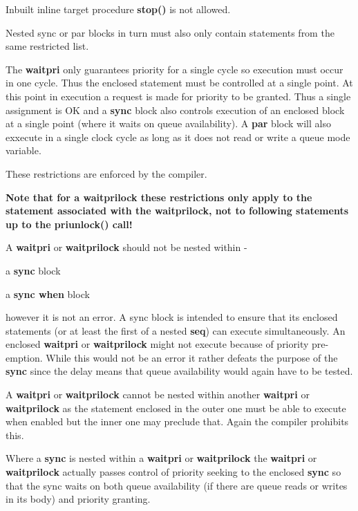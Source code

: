         Inbuilt inline target procedure {\bf stop()} is not allowed.
        
        Nested sync or par blocks in turn must also only contain
        statements from the same restricted list.

        The {\bf waitpri} only guarantees priority for a single cycle so
        execution must occur in one cycle. Thus the enclosed statement must be
        controlled at a single point. At this point in execution a request is
        made for priority to be granted. Thus a single assignment is OK and a
        {\bf sync} block also controls execution of an enclosed block at a
        single point (where it waits on queue availability). A {\bf par} block
        will also exxecute in a single clock cycle as long as it does not read
        or write a queue mode variable.

        These restrictions are enforced by the compiler.
        
        {\bf Note that for a waitprilock these restrictions only apply to the
        statement associated with the waitprilock, not to following
        statements up to the priunlock() call!}
        
        A {\bf waitpri} or {\bf waitprilock} should not be nested within -
        
        \blist
        \item   a {\bf sync} block
        \item   a {\bf sync when } block
        \blend
        
        however it is not an error. A sync block is intended to ensure that its
        enclosed statements (or at least the first of a nested {\bf seq}) can
        execute simultaneously. An enclosed {\bf waitpri} or {\bf waitprilock}
        might not execute because of priority pre-emption. While this would not
        be an error it rather defeats the purpose of the {\bf sync} since the
        delay means that queue availability would again have to be tested.
        
        A {\bf waitpri} or {\bf waitprilock} cannot be nested within another
        {\bf waitpri} or {\bf waitprilock} as the statement enclosed in the
        outer one must be able to execute when enabled but the inner one may
        preclude that. Again the compiler prohibits this.
        
        Where a {\bf sync} is nested within a {\bf waitpri} or {\bf
        waitprilock}  the {\bf waitpri} or {\bf waitprilock} actually passes
        control of priority seeking to the enclosed {\bf sync} so that the sync
        waits on both queue availability (if there are queue reads or writes in
        its body) and priority granting.
        
